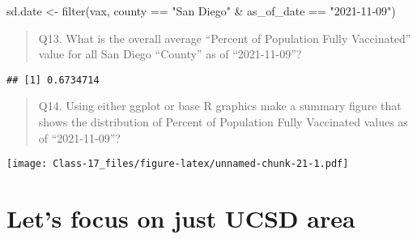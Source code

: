 \documentclass[
]{article}
\newenvironment{Shaded}{\begin{snugshade}}{\end{snugshade}}
\newcommand{\AttributeTok}[1]{\textcolor[rgb]{0.77,0.63,0.00}{#1}}
\newcommand{\ConstantTok}[1]{\textcolor[rgb]{0.00,0.00,0.00}{#1}}
\newcommand{\DecValTok}[1]{\textcolor[rgb]{0.00,0.00,0.81}{#1}}
\newcommand{\FunctionTok}[1]{\textcolor[rgb]{0.00,0.00,0.00}{#1}}
\newcommand{\NormalTok}[1]{#1}
\newcommand{\OtherTok}[1]{\textcolor[rgb]{0.56,0.35,0.01}{#1}}
\newcommand{\SpecialCharTok}[1]{\textcolor[rgb]{0.00,0.00,0.00}{#1}}
\newcommand{\StringTok}[1]{\textcolor[rgb]{0.31,0.60,0.02}{#1}}
\begin{document}
\begin{Shaded}
\begin{Highlighting}[]
\NormalTok{sd.date }\OtherTok{\textless{}{-}} \FunctionTok{filter}\NormalTok{(vax, county }\SpecialCharTok{==} \StringTok{"San Diego"} \SpecialCharTok{\&}\NormalTok{ as\_of\_date }\SpecialCharTok{==} \StringTok{"2021{-}11{-}09"}\NormalTok{)}
\end{Highlighting}
\end{Shaded}

\begin{quote}
Q13. What is the overall average ``Percent of Population Fully
Vaccinated'' value for all San Diego ``County'' as of ``2021-11-09''?
\end{quote}

\begin{Shaded}
\end{Shaded}

\begin{verbatim}
## [1] 0.6734714
\end{verbatim}

\begin{quote}
Q14. Using either ggplot or base R graphics make a summary figure that
shows the distribution of Percent of Population Fully Vaccinated values
as of ``2021-11-09''?
\end{quote}

\begin{Shaded}
\end{Shaded}

\texttt{[image: Class-17\_files/figure-latex/unnamed-chunk-21-1.pdf]}

\hypertarget{lets-focus-on-just-ucsd-area}{%
\section{Let's focus on just UCSD
area}\label{lets-focus-on-just-ucsd-area}}

\begin{Shaded}
\end{Shaded}
\end{document}
